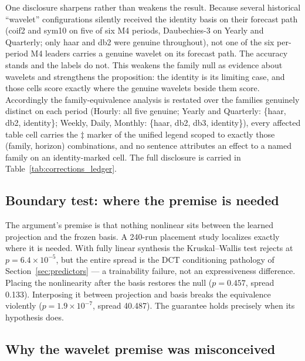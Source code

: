One disclosure sharpens rather than weakens the result. Because several
historical ``wavelet'' configurations silently received the identity basis
on their forecast path (coif2 and sym10 on five of six M4 periods,
Daubechies-3 on Yearly and Quarterly; only haar and db2 were genuine
throughout), not one of the six per-period M4 leaders carries a genuine
wavelet on its forecast path. The accuracy stands and the labels do not.
This weakens the family null as evidence about wavelets and strengthens
the proposition: the identity is its limiting case, and those cells score
exactly where the genuine wavelets beside them score. Accordingly the
family-equivalence analysis is restated over the families genuinely
distinct on each period (Hourly: all five genuine; Yearly and Quarterly:
\{haar, db2, identity\}; Weekly, Daily, Monthly: \{haar, db2, db3,
identity\}), every affected table cell carries the $\ddagger$ marker of
the unified legend scoped to exactly those (family, horizon) combinations,
and no sentence attributes an effect to a named family on an
identity-marked cell. The full disclosure is carried in
Table~\ref{tab:corrections_ledger}.

\subsection{Boundary test: where the premise is needed}
\label{sec:completeness:boundary}

The argument's premise is that nothing nonlinear sits between the learned
projection and the frozen basis. A 240-run placement study localizes
exactly where it is needed. With fully linear synthesis the Kruskal--Wallis
test rejects at $p = 6.4\times10^{-5}$, but the entire spread is the DCT
conditioning pathology of Section~\ref{sec:predictors} --- a trainability
failure, not an expressiveness difference. Placing the nonlinearity after
the basis restores the null ($p = 0.457$, spread 0.133). Interposing it
between projection and basis breaks the equivalence violently
($p = 1.9\times10^{-7}$, spread 40.487). The guarantee holds precisely
when its hypothesis does.

\subsection{Why the wavelet premise was misconceived}
\label{sec:completeness:misconceived}

